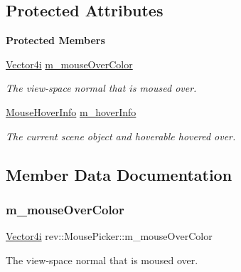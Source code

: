 \subsection*{Protected Attributes}
\begin{Indent}\textbf{ Protected Members}\par
\begin{DoxyCompactItemize}
\item 
\mbox{\hyperlink{classrev_1_1_vector}{Vector4i}} \mbox{\hyperlink{classrev_1_1_mouse_picker_a46d15ba956fa03838715d53f2b7bc8d4}{m\+\_\+mouse\+Over\+Color}}
\begin{DoxyCompactList}\small\item\em The view-\/space normal that is moused over. \end{DoxyCompactList}\item 
\mbox{\label{classrev_1_1_mouse_picker_a8a76c283e42ecc801d575787920361b0}} 
\mbox{\hyperlink{structrev_1_1_mouse_hover_info}{Mouse\+Hover\+Info}} \mbox{\hyperlink{classrev_1_1_mouse_picker_a8a76c283e42ecc801d575787920361b0}{m\+\_\+hover\+Info}}
\begin{DoxyCompactList}\small\item\em The current scene object and hoverable hovered over. \end{DoxyCompactList}\end{DoxyCompactItemize}
\end{Indent}


\subsection{Member Data Documentation}
\mbox{\label{classrev_1_1_mouse_picker_a46d15ba956fa03838715d53f2b7bc8d4}} 
\subsubsection{\texorpdfstring{m\_mouseOverColor}{m\_mouseOverColor}}
{\footnotesize\ttfamily \mbox{\hyperlink{classrev_1_1_vector}{Vector4i}} rev\+::\+Mouse\+Picker\+::m\+\_\+mouse\+Over\+Color\hspace{0.3cm}{\ttfamily [protected]}}



The view-\/space normal that is moused over. 

